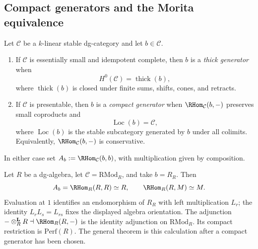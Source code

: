 \subsection{Compact generators and the Morita equivalence}

\begin{definition}
\label{def:compact-generator}
Let $\mathcal C$ be a $k$-linear stable dg-category and let
$b\in\mathcal C$.
\begin{enumerate}[label=\textup{(\roman*)}]
\item If $\mathcal C$ is essentially small and idempotent complete,
then $b$ is a \emph{thick generator} when
\[
 H^0(\mathcal C)=\operatorname{thick}(b),
\]
where $\operatorname{thick}(b)$ is closed under finite sums, shifts,
cones, and retracts.
\item If $\mathcal C$ is presentable, then $b$ is a \emph{compact
generator} when $\RHom_{\mathcal C}(b,-)$ preserves small coproducts
and
\[
 \operatorname{Loc}(b)=\mathcal C,
\]
where $\operatorname{Loc}(b)$ is the stable subcategory generated by
$b$ under all colimits.  Equivalently,
$\RHom_{\mathcal C}(b,-)$ is conservative.
\end{enumerate}
In either case set $A_b:=\RHom_{\mathcal C}(b,b)$, with multiplication
given by composition.
\end{definition}

\begin{computation}
\label{comp:morita-free-generator}
Let $R$ be a dg-algebra, let $\mathcal C=\mathrm{RMod}_R$, and take
$b=R_R$.  Then
\[
 A_b=\RHom_R(R,R)\simeq R,
 \qquad
 \RHom_R(R,M)\simeq M.
\]
Evaluation at $1$ identifies an endomorphism of $R_R$ with left
multiplication $L_r$; the identity
$L_rL_s=L_{rs}$ fixes the displayed algebra orientation.
The adjunction
$-\otimes_R^{\mathbf L}R\dashv\RHom_R(R,-)$ is the identity
adjunction on $\mathrm{RMod}_R$.  Its compact restriction is
$\mathrm{Perf}(R)$.  The general theorem is this calculation after a
compact generator has been chosen.
\end{computation}

